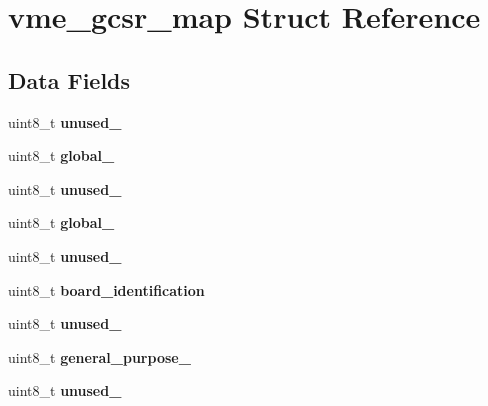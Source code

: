 \hypertarget{structvme__gcsr__map}{}\section{vme\+\_\+gcsr\+\_\+map Struct Reference}
\label{structvme__gcsr__map}
\subsection*{Data Fields}
\begin{DoxyCompactItemize}
\item 
\mbox{\label{structvme__gcsr__map_a0005e8b20478e7b7171f8e7ec5ed50e9}} 
uint8\+\_\+t {\bfseries unused\+\_}
\item 
\mbox{\label{structvme__gcsr__map_ae5d0066c9fdae0d07eaf5a536ada4274}} 
uint8\+\_\+t {\bfseries global\+\_}
\item 
\mbox{\label{structvme__gcsr__map_a4e5e73a1a2da6653100fa20cbb5a8f18}} 
uint8\+\_\+t {\bfseries unused\+\_}
\item 
\mbox{\label{structvme__gcsr__map_af76ce7ef761ad27e65d6d5cf6548e203}} 
uint8\+\_\+t {\bfseries global\+\_}
\item 
\mbox{\label{structvme__gcsr__map_addeac2ee33d8dab6385adcb860ce9cd6}} 
uint8\+\_\+t {\bfseries unused\+\_}
\item 
\mbox{\label{structvme__gcsr__map_a673a53d253894c4a475039642fbfa949}} 
uint8\+\_\+t {\bfseries board\+\_\+identification}
\item 
\mbox{\label{structvme__gcsr__map_ac9d806bad8d1b9bf0e8ee8226e3cc0c8}} 
uint8\+\_\+t {\bfseries unused\+\_}
\item 
\mbox{\label{structvme__gcsr__map_a1fe93b784812b542cb99ad37d733d726}} 
uint8\+\_\+t {\bfseries general\+\_\+purpose\+\_}
\item 
\mbox{\label{structvme__gcsr__map_ac314360ed174a5fca43420465fb665d6}} 
uint8\+\_\+t {\bfseries unused\+\_}

\end{DoxyCompactItemize}
